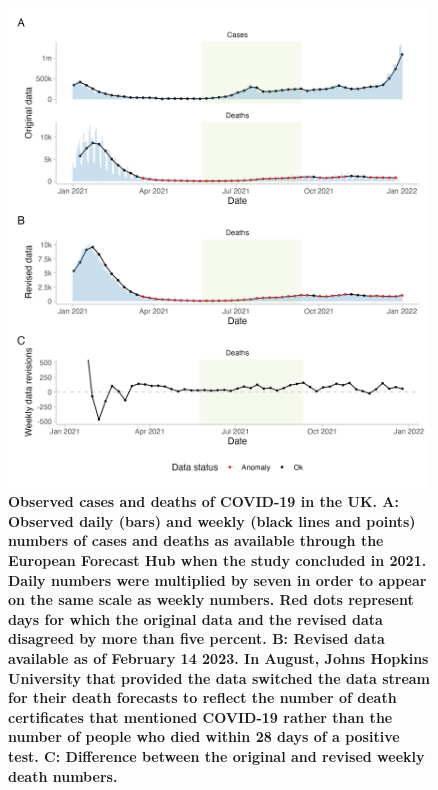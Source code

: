 \documentclass[10pt,a4paper,twocolumn]{article}
\begin{document}
\begin{figure}
\centering
\includegraphics[width=0.99\textwidth]{../output/figures/plot-data.png}
\caption{\bf{Observed cases and deaths of COVID-19 in the UK}. A: Observed daily (bars) and weekly (black lines and points) numbers of cases and deaths as available through the European Forecast Hub when the study concluded in 2021. Daily numbers were multiplied by seven in order to appear on the same scale as weekly numbers. Red dots represent days for which the original data and the revised data disagreed by more than five percent. B: Revised data available as of February 14 2023. In August, Johns Hopkins University that provided the data switched the data stream for their death forecasts to reflect the number of death certificates that mentioned COVID-19 rather than the number of people who died within 28 days of a positive test. C: Difference between the original and revised weekly death numbers.}
\label{fig:plot-data}
\end{figure}



\end{document}
